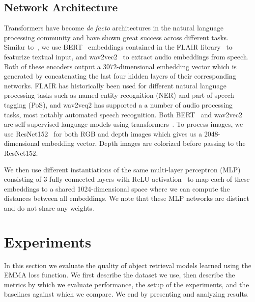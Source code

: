 \documentclass[sigconf,natbib=true,anonymous=true]{acmart}
\begin{document}
\subsection{Network Architecture}
\label{sec:Model}

Transformers have become \textit{de facto} architectures in the natural language processing community and have shown great success across different tasks. Similar to~\citet{GoLD_UMBC}, we use BERT~\citep{devlin-etal-2019-bert} embeddings contained in the FLAIR library~\citep{akbik2019flair,akbik-etal-2019-pooled} to featurize textual input, and wav2vec2~\citep{wav2vec2} to extract audio embeddings from speech. Both of these encoders output a 3072-dimensional embedding vector which is generated by concatenating the last four hidden layers of their corresponding networks.
FLAIR has historically been used for different natural language processing tasks such as named entity recognition (NER) and part-of-speech tagging (PoS), and wav2veq2 has supported a a number of audio processing tasks, most notably automated speech recognition.
Both BERT~\citep{devlin-etal-2019-bert} and wav2vec2~\citep{wav2vec2} are self-supervised language models using transformers~\citep{vaswani2017attention}.
% 
To process images, we use ResNet152~\citep{He_resnet_2016} for both RGB and depth images which gives us a 2048-dimensional embedding vector. Depth images are colorized before passing to the ResNet152.

We then use different instantiations of the same multi-layer perceptron (MLP) consisting of 3 fully connected layers with ReLU activation~\citep{relu2010} to map each of these embeddings to a shared 1024-dimensional space where we can compute the distances between all embeddings. We note that these MLP networks are distinct and do not share any weights.






\section{Experiments}
\label{sec:Experiments}

In this section we evaluate the quality of object retrieval models learned using the EMMA loss function. We first describe the dataset we use, then describe the metrics by which we evaluate performance, the setup of the experiments, and the baselines against which we compare. We end by presenting and analyzing results.
\end{document}
